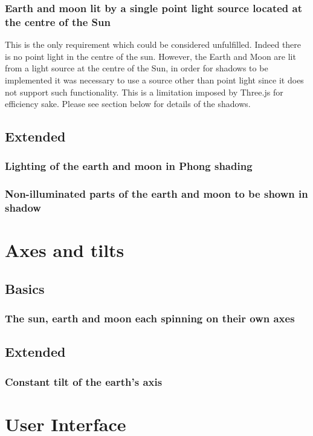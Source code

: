 \documentclass[titlepage]{article}
\begin{document}
\subsubsection{Earth and moon lit by a single point light source located at the centre of the Sun}
This is the only requirement which could be considered unfulfilled. Indeed there is no point light in the centre of the sun. However, the Earth and Moon are lit from a light source at the centre of the Sun, in order for shadows to be implemented it was necessary to use a source other than point light since it does not support such functionality. This is a limitation imposed by Three.js for efficiency sake. Please see section below for details of the shadows.
\subsection{Extended}
\subsubsection{Lighting of the earth and moon in Phong shading}
\subsubsection{Non-illuminated parts of the earth and moon to be shown in shadow}
\medskip

\section{Axes and tilts}

\subsection{Basics}
\subsubsection{The sun, earth and moon each spinning on their own axes}
\subsection{Extended}
\subsubsection{Constant tilt of the earth’s axis}

\section{User Interface}
\end{document}
